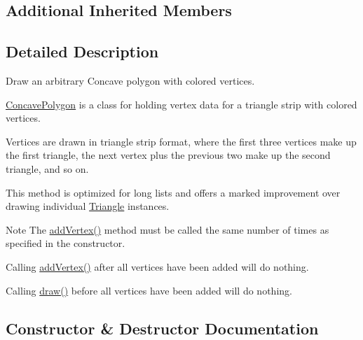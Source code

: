 \subsection*{Additional Inherited Members}


\subsection{Detailed Description}
Draw an arbitrary Concave polygon with colored vertices. 

\hyperlink{classtsgl_1_1_concave_polygon}{Concave\+Polygon} is a class for holding vertex data for a triangle strip with colored vertices.

Vertices are drawn in triangle strip format, where the first three vertices make up the first triangle, the next vertex plus the previous two make up the second triangle, and so on.

This method is optimized for long lists and offers a marked improvement over drawing individual \hyperlink{classtsgl_1_1_triangle}{Triangle} instances. \begin{DoxyNote}{Note}
The \hyperlink{classtsgl_1_1_shape_ac0ea13ecde43ce62262f82597fb94755}{add\+Vertex()} method must be called the same number of times as specified in the constructor. 

Calling \hyperlink{classtsgl_1_1_shape_ac0ea13ecde43ce62262f82597fb94755}{add\+Vertex()} after all vertices have been added will do nothing. 

Calling \hyperlink{classtsgl_1_1_concave_polygon_adf288a6b60873a7ae5e599f63868da82}{draw()} before all vertices have been added will do nothing. 
\end{DoxyNote}


\subsection{Constructor \& Destructor Documentation}
\mbox{\label{classtsgl_1_1_concave_polygon_a2440ccec9c6ece06b891b07bcf608868}} 
